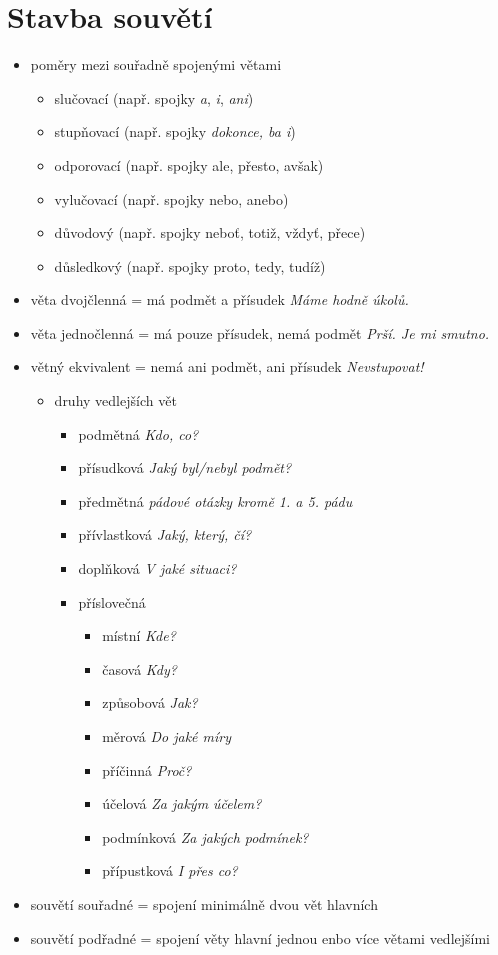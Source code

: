 \documentclass{memoir}
\begin{document}
\section*{Stavba souvětí}
\begin{itemize}
\item poměry mezi souřadně spojenými větami
    \begin{itemize}
    \item slučovací (např. spojky \textit{a}, \textit{i}, \textit{ani})
    \item stupňovací (např. spojky \textit{dokonce, ba i})
    \item odporovací (např. spojky ale, přesto, avšak)
    \item vylučovací (např. spojky nebo, anebo)
    \item důvodový (např. spojky neboť, totiž, vždyť, přece)
    \item důsledkový (např. spojky proto, tedy, tudíž)
    \end{itemize}
    \item věta dvojčlenná = má podmět a přísudek \hfill \textit{Máme hodně úkolů.}
   	\item věta jednočlenná = má pouze přísudek, nemá podmět \hfill \textit{Prší. Je mi smutno.}
   	\item větný ekvivalent = nemá ani podmět, ani přísudek \hfill \textit{Nevstupovat!}
   	\begin{itemize}
    \item druhy vedlejších vět
    \begin{itemize}
    \item podmětná \hfill \textit{Kdo, co?}
   	\item přísudková \hfill \textit{Jaký byl/nebyl podmět?}
   	\item předmětná \hfill \textit{pádové otázky kromě 1. a 5. pádu}
   	\item přívlastková \hfill \textit{Jaký, který, čí?}
   	\item doplňková \hfill \textit{V jaké situaci?}
   	\item příslovečná
    \begin{itemize}
    \item místní \hfill \textit{Kde?}
   	\item časová \hfill \textit{Kdy?}
   	\item způsobová \hfill \textit{Jak?}
   	\item měrová \hfill \textit{Do jaké míry}
   	\item příčinná \hfill \textit{Proč?}
   	\item účelová \hfill \textit{Za jakým účelem?}
   	\item podmínková \hfill \textit{Za jakých podmínek?}
   	\item přípustková \hfill \textit{I přes co?}
    \end{itemize}
    \end{itemize}
    \end{itemize}
   	\item souvětí souřadné = spojení minimálně dvou vět hlavních
   	\item souvětí podřadné = spojení věty hlavní jednou enbo více větami vedlejšími
\end{itemize}
\end{document}

